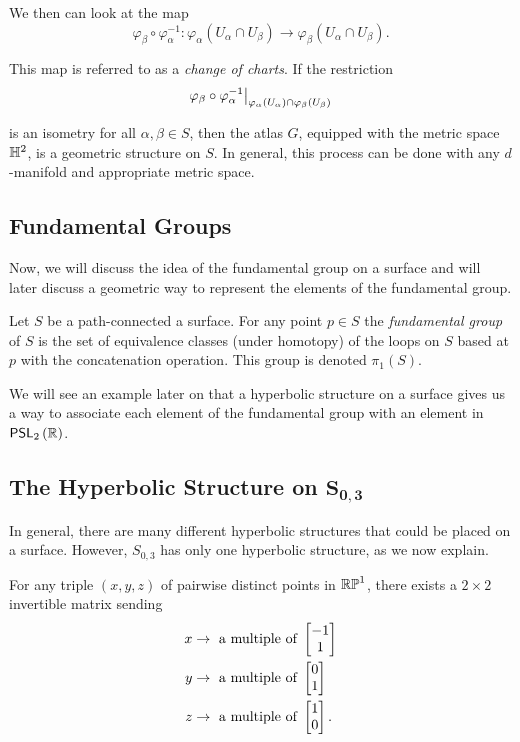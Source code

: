 \documentclass{amsart}
\begin{document}
	
	We then can look at the map
	\begin{equation*}
		\varphi_\beta \circ \varphi_\alpha^{-1} \colon \varphi_\alpha(U_\alpha \cap U_\beta) \to \varphi_\beta(U_\alpha \cap U_\beta).
	\end{equation*}
	
	This map is referred to as a \emph{change of charts}. If the restriction 
	\begin{equation*}
		\restrict{\varphi_\beta \circ \varphi_\alpha^{-1}}{\varphi_\alpha(U_\alpha) \cap \varphi_\beta(U_\beta)}
	\end{equation*} 
	
	is an isometry for all $\alpha, \beta \in S$, then the atlas $G$, equipped with the metric space $\mathbb{H}^2$, is a geometric structure on $S$. In general, this process can be done with any $d$-manifold and appropriate metric space.
	
	
	\subsection{Fundamental Groups}
	\label{sec:fundamental_groups}
	
	Now, we will discuss the idea of the fundamental group on a surface and will later discuss a geometric way to represent the elements of the fundamental group.
	
	\begin{definition}
		Let $S$ be a path-connected a surface. For any point $p\in S$ the \emph{fundamental group} of $S$ is the set of equivalence classes (under homotopy) of the loops on $S$ based at $p$ with the concatenation operation. This group is denoted $\pi_1(S)$.
	\end{definition}
	
	We will see an example later on that a hyperbolic structure on a surface gives us a way to associate each element of the fundamental group with an element in $\mathsf{PSL}_{2}\left(\mathbb{R}\right)$.
	
	\subsection{The Hyperbolic Structure on $\mathbf{ S_{0,3} }$}
	
	In general, there are many different hyperbolic structures that could be placed on a surface. However, $S_{0,3}$ has only one hyperbolic structure, as we now explain.
	
	\begin{lemma}
		\label{lem:triple_invertible_matrix}
		For any triple $(x,y,z)$ of pairwise distinct points in $\mathbb{RP}^1$, there exists a $2\times2$ invertible matrix sending
		\begin{equation*}
			\begin{split}
				x & \to \text{ a multiple of } \begin{bmatrix} -1 \\ 1 \end{bmatrix} \\
				y & \to \text{ a multiple of } \begin{bmatrix} 0 \\ 1 \end{bmatrix} \\
				z & \to \text{ a multiple of } \begin{bmatrix} 1 \\ 0 \end{bmatrix}.
			\end{split}
		\end{equation*}
	\end{lemma} 
	
\end{document}
